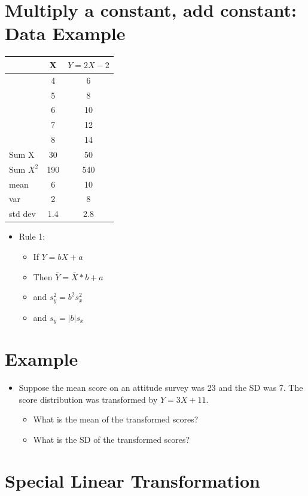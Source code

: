 \documentclass[12pt]{article}
\begin{document}
\section{Multiply a constant, add constant: Data
Example}\label{multiply-a-constant-add-constant-data-example}

\begin{longtable}[c]{@{}lcc@{}}
\toprule
& X & \(Y = 2X - 2\)\tabularnewline
\midrule
\endhead
& 4 & 6\tabularnewline
& 5 & 8\tabularnewline
& 6 & 10\tabularnewline
& 7 & 12\tabularnewline
& 8 & 14\tabularnewline
\midrule
Sum X & 30 & 50\tabularnewline
Sum \(X^2\) & 190 & 540\tabularnewline
mean & 6 & 10\tabularnewline
var & 2 & 8\tabularnewline
std dev & 1.4 & 2.8\tabularnewline
\bottomrule
\end{longtable}

\begin{itemize}
\itemsep1pt\parskip0pt
\item
  Rule 1:

  \begin{itemize}
  \itemsep1pt\parskip0pt
  \item
    If \(Y = bX + a\)
  \item
    Then \(\bar{Y} = \bar{X} * b + a\)
  \item
    and \(s_{y}^2 = b^2s_{x}^2\)
  \item
    and \(s_{y} = |b|s_{x}\)
  \end{itemize}
\end{itemize}

\section{Example}\label{example}

\begin{itemize}
\itemsep1pt\parskip0pt
\item
  Suppose the mean score on an attitude survey was 23 and the SD was 7.
  The score distribution was transformed by \(Y = 3X + 11\).

  \begin{itemize}
  \itemsep1pt\parskip0pt
  \item
    What is the mean of the transformed scores?
  \item
    What is the SD of the transformed scores?
  \end{itemize}
\end{itemize}

\section{Special Linear
Transformation}\label{special-linear-transformation}
\end{document}
